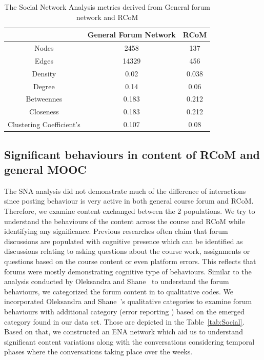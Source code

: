 \documentclass[format=acmsmall, review=false, screen=true]{acmart}
\begin{document}
\begin{table}[h!]
\caption{The Social Network Analysis metrics derived from General forum network and RCoM}
\label{tab:SNATab}
 \begin{tabular}{c|c|c}
 \toprule
 & General Forum Network & RCoM \\
 \midrule
 Nodes	& 2458 & 137 \\
 Edges & 14329 & 456 \\
 Density & 0.02 & 0.038 \\
 Degree & 0.14 & 0.06 \\ 
 Betweennes & 0.183 & 0.212 \\ 
 Closeness & 0.183 & 0.212 \\
 Clustering 
 Coefficient's & 0.107 & 0.08 \\
 \bottomrule
 \end{tabular}
 \end{table}


\subsection{Significant behaviours in content of RCoM and general MOOC}

The SNA analysis did not demonstrate much of the difference of interactions since posting behaviour is very active in both general course forum and RCoM. Therefore, we examine content exchanged between the 2 populations. We try to understand the behaviours of the content across the course and RCoM while identifying any significance. Previous researches often claim that forum discussions are populated with cognitive presence which can be identified as discussions relating to asking questions about the course work, assignments or questions based on the course content or even platform errors. This reflects that forums were mostly demonstrating cognitive type of behaviours. Similar to the analysis conducted by Oleksandra and Shane~\cite{oleksandra2016untangling} to understand the forum behaviours, we categorized the forum content in to qualitative codes. We incorporated Oleksandra and Shane~\cite{oleksandra2016untangling}'s qualitative categories to examine forum behaviours with additional category (error reporting ) based on the emerged category found in our data set. Those are depicted in the Table~\ref{tab:Social}. Based on that, we constructed an ENA network which aid us to understand significant content variations along with the conversations considering temporal phases where the conversations taking place over the weeks. 
\end{document}
